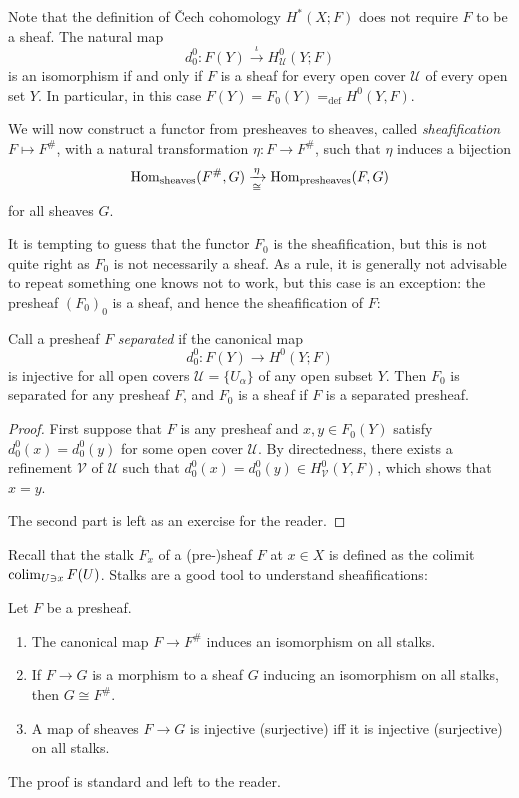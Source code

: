 \documentclass[a4paper,openany]{scrbook}
\begin{document}
Note that the definition of \v Cech cohomology $H^*(X;F)$ does not require $F$ to be a sheaf. The natural map
\[
d_0^0\colon F(Y) \xrightarrow{\iota} H^0_{\mathcal U}(Y;F)
\]
is an isomorphism if and only if $F$ is a sheaf for every open cover $\mathcal U$ of every open set $Y$. In particular, in this case $F(Y) = F_0(Y) =_{\operatorname{def}} H^0(Y,F)$.

We will now construct a functor from presheaves to sheaves, called \emph{sheafification} $F \mapsto F^\#$, with a natural transformation $\eta\colon F \to F^\#$, such that $\eta$ induces a bijection
\[
\operatorname{Hom}_{\text{sheaves}}(F^\#,G) \xrightarrow[\cong]{\eta} \operatorname{Hom}_{\text{presheaves}}(F,G)
\]
for all sheaves $G$.

It is tempting to guess that the functor $F_0$ is the sheafification, but this is not quite right as $F_0$ is not necessarily a sheaf. As a rule, it is generally not advisable to repeat something one knows not to work, but this case is an exception: the presheaf $(F_0)_0$ is a sheaf, and hence the sheafification of $F$:

\begin{thm}\label{thm:sheafification}
Call a presheaf $F$ \emph{separated} if the canonical map
\[
d_0^0\colon F(Y) \to H^0(Y;F)
\]
is injective for all open covers $\mathcal U=\{U_\alpha\}$ of any open subset $Y$. Then $F_0$ is separated for any presheaf $F$, and $F_0$ is a sheaf if $F$ is a separated presheaf.
\end{thm}
\begin{proof}
First suppose that $F$ is any presheaf and $x,y \in F_0(Y)$ satisfy $d_0^0(x)=d_0^0(y)$ for some open cover $\mathcal U$. By directedness, there exists a refinement $\mathcal V$ of $\mathcal U$ such that $d_0^0(x)=d_0^0(y) \in H^0_{\mathcal V}(Y,F)$, which shows that $x=y$.

The second part is left as an exercise for the reader.
\end{proof}

Recall that the stalk $F_x$ of a (pre-)sheaf $F$ at $x \in X$ is defined as the colimit $\operatorname*{colim}_{U \ni x} F(U)$. Stalks are a good tool to understand sheafifications:
\begin{lemma}\label{lemma:stalklemma}
Let $F$ be a presheaf.
\begin{enumerate}
	\item The canonical map $F \to F^\#$ induces an isomorphism on all stalks.
	\item If $F \to G$ is a morphism to a sheaf $G$ inducing an isomorphism on all stalks, then $G \cong F^\#$.
	\item A map of sheaves $F \to G$ is injective (surjective) iff it is injective (surjective) on all stalks.
\end{enumerate}
\end{lemma}
The proof is standard and left to the reader.
\end{document}
